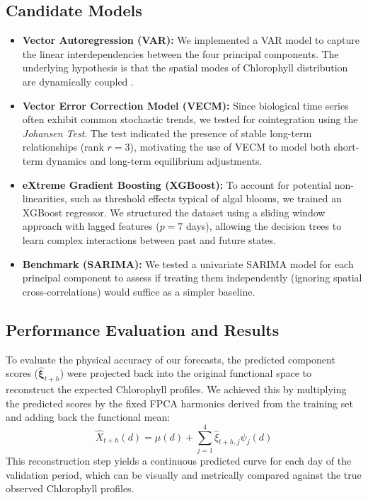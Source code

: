 \subsection{Candidate Models}
\begin{itemize}
    \item \textbf{Vector Autoregression (VAR):} We implemented a VAR model to capture the linear interdependencies between the four principal components. The underlying hypothesis is that the spatial modes of Chlorophyll distribution are dynamically coupled \cite{ghani2007modelling}.
    \item \textbf{Vector Error Correction Model (VECM):} Since biological time series often exhibit common stochastic trends, we tested for cointegration using the \textit{Johansen Test}. The test indicated the presence of stable long-term relationships (rank $r=3$), motivating the use of VECM to model both short-term dynamics and long-term equilibrium adjustments\cite{hamilton1994time}.
    \item \textbf{eXtreme Gradient Boosting (XGBoost):} To account for potential non-linearities, such as threshold effects typical of algal blooms, we trained an XGBoost regressor. We structured the dataset using a sliding window approach with lagged features ($p=7$ days), allowing the decision trees to learn complex interactions between past and future states\cite{kim2022development}.
    \item \textbf{Benchmark (SARIMA):} We tested a univariate SARIMA model for each principal component to assess if treating them independently (ignoring spatial cross-correlations) would suffice as a simpler baseline\cite{hyndman2018forecasting}.
\end{itemize}

\subsection{Performance Evaluation and Results}

To evaluate the physical accuracy of our forecasts, the predicted component scores ($\hat{\boldsymbol{\xi}}_{t+h}$) were projected back into the original functional space to reconstruct the expected Chlorophyll profiles. We achieved this by multiplying the predicted scores by the fixed FPCA harmonics derived from the training set and adding back the functional mean:
$$\hat{X}_{t+h}(d) = \mu(d) + \sum_{j=1}^{4} \hat{\xi}_{t+h,j} \psi_j(d)$$
This reconstruction step yields a continuous predicted curve for each day of the validation period, which can be visually and metrically compared against the true observed Chlorophyll profiles.

